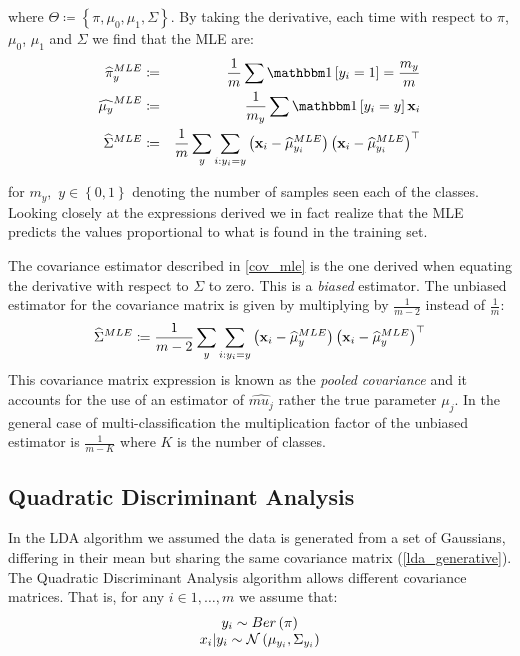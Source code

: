 where $\Theta\coloneqq\left\{\pi,\mu_0,\mu_1,\Sigma\right\}$. By taking the derivative, each time with respect to $\pi$, $\mu_0$, $\mu_1$ and $\Sigma$ we find that the MLE are:
\begin{eqnarray}
\widehat{\pi}^{MLE}_y &\coloneqq &\frac{1}{m}\sum \indc{y_i = 1} = \frac{m_y}{m} \\
\widehat{\mu_y}^{MLE} &\coloneqq &\frac{1}{m_y}\sum \indc{y_i=y}\x_i \\
\widehat{\Sigma}^{MLE} &\coloneqq &\frac{1}{m} \sum_y \sum_{i:y_i=y}\left(\x_i-\widehat{\mu}_{y_i}^{MLE}\right)\left(\x_i-\widehat{\mu}_{y_i}^{MLE}\right)^\top \label{cov_mle}
\end{eqnarray}

for $m_y, \,\,y\in\left\{0,1\right\}$ denoting the number of samples seen each of the classes. Looking closely at the expressions derived we in fact realize that the MLE predicts the values proportional to what is found in the training set.

\begin{remark}
The covariance estimator described in \ref{cov_mle} is the one derived when equating the derivative with respect to $\Sigma$ to zero. This is a \textit{biased} estimator. The unbiased estimator for the covariance matrix is given by multiplying by $\frac{1}{m-2}$ instead of $\frac{1}{m}$:
$$ \widehat{\Sigma}^{MLE} \coloneqq \frac{1}{m-2} \sum_y \sum_{i:y_i=y}\left(\mathbf{x}_i-\widehat{\mu}_y^{MLE}\right)\left(\mathbf{x}_i-\widehat{\mu}_y^{MLE}\right)^\top$$
This covariance matrix expression is known as the \textit{pooled covariance} and it accounts for the use of an estimator of $\widehat{mu_j}$ rather the true parameter $\mu_j$. In the general case of multi-classification the multiplication factor of the unbiased estimator is $\frac{1}{m-K} $ where $K$ is the number of classes.
\end{remark}

\subsection{Quadratic Discriminant Analysis}
In the LDA algorithm we assumed the data is generated from a set of Gaussians, differing in their mean but sharing the same covariance matrix (\ref{lda_generative}). The Quadratic Discriminant Analysis algorithm allows different covariance matrices. That is, for any $i\in 1,\ldots,m$ we assume that:
\begin{equation}\label{qda_generative}
	\begin{array}{c}
		y_i \sim Ber\left(\pi\right) \\
		x_i|y_i \sim \mathcal{N}\left(\mu_{y_i},\Sigma_{y_i}\right)
	\end{array}
\end{equation}

